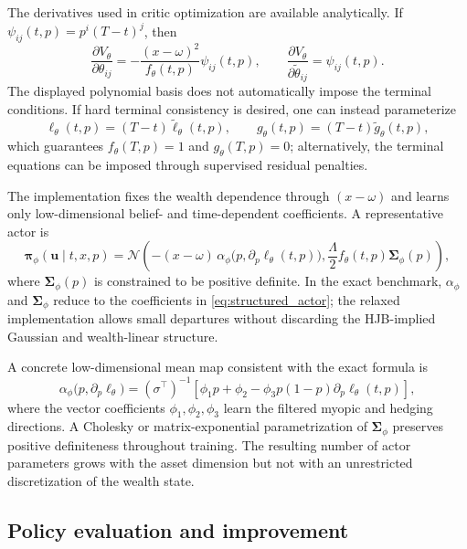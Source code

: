 \documentclass[a4paper,10pt]{article}
\newcommand{\N}{\mathcal{N}}
\newcommand{\bpi}{\bm{\pi}}
\newcommand{\bu}{\bm{u}}
\newcommand{\bSigma}{\bm{\Sigma}}
\begin{document}
The derivatives used in critic optimization are available analytically. If
$\psi_{ij}(t,p)=p^i(T-t)^j$, then
\begin{equation}
\frac{\partial V_\theta}{\partial\theta_{ij}}
=-\frac{(x-\omega)^2}{f_\theta(t,p)}\psi_{ij}(t,p),
\qquad
\frac{\partial V_\theta}{\partial\widetilde\theta_{ij}}
=\psi_{ij}(t,p).
\label{eq:critic_gradients}
\end{equation}
The displayed polynomial basis does not automatically impose the terminal conditions. If hard terminal consistency is desired, one can instead parameterize
\begin{equation}
\ell_\theta(t,p)=(T-t)\widetilde\ell_\theta(t,p),
\qquad
g_\theta(t,p)=(T-t)\widetilde g_\theta(t,p),
\end{equation}
which guarantees $f_\theta(T,p)=1$ and $g_\theta(T,p)=0$; alternatively, the terminal equations can be imposed through supervised residual penalties.

The implementation fixes the wealth dependence through $(x-\omega)$ and
learns only low-dimensional belief- and time-dependent coefficients. A representative actor is
\begin{equation}
\bpi_\phi(\bu\mid t,x,p)
=\N\left(
-(x-\omega)\,\alpha_\phi\bigl(p,\partial_p\ell_\theta(t,p)\bigr),
\frac{\Lambda}{2}f_\theta(t,p)\bSigma_\phi(p)
\right),
\end{equation}
where $\bSigma_\phi(p)$ is constrained to be positive definite. In the exact benchmark, $\alpha_\phi$ and $\bSigma_\phi$ reduce to the coefficients in \eqref{eq:structured_actor}; the relaxed implementation allows small departures without discarding the HJB-implied Gaussian and wealth-linear structure.

A concrete low-dimensional mean map consistent with the exact formula is
\begin{equation}
\alpha_\phi\bigl(p,\partial_p\ell_\theta\bigr)
=(\sigma^\top)^{-1}
\left[
\phi_1p+\phi_2-\phi_3p(1-p)\partial_p\ell_\theta(t,p)
\right],
\label{eq:actor_low_dimensional}
\end{equation}
where the vector coefficients $\phi_1,\phi_2,\phi_3$ learn the filtered myopic and hedging directions. A Cholesky or matrix-exponential parametrization of $\bSigma_\phi$ preserves positive definiteness throughout training. The resulting number of actor parameters grows with the asset dimension but not with an unrestricted discretization of the wealth state.

\subsection{Policy evaluation and improvement}
\end{document}
